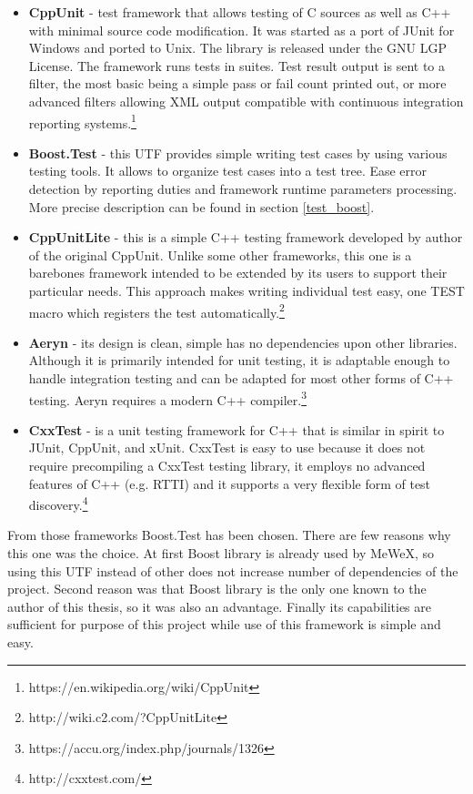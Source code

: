 \begin{itemize}
    \item \textbf{CppUnit} - test framework that allows testing of C sources as well as C++ with minimal source code modification.
            It was started as a port of JUnit for Windows and ported to Unix. The library is released under the GNU LGP License.
            The framework runs tests in suites. Test result output is sent to a filter, the most basic being a simple pass or fail count printed out, 
            or more advanced filters allowing XML output compatible with continuous integration reporting systems.\footnote{https://en.wikipedia.org/wiki/CppUnit}
    \item \textbf{Boost.Test} - this UTF provides simple writing test cases by using various testing tools. 
            It allows to organize test cases into a test tree. Ease error detection by reporting duties and framework runtime parameters processing.
            More precise description can be found in section \ref{test_boost}.
    \item \textbf{CppUnitLite} - this is a simple C++ testing framework developed by author of the original CppUnit. 
            Unlike some other frameworks, this one is a barebones framework intended to be extended by its users to support their particular needs.
            This approach makes writing individual test easy, one TEST macro which registers the test automatically.\footnote{http://wiki.c2.com/?CppUnitLite}
    \item \textbf{Aeryn} - its design is clean, simple has no dependencies upon other libraries. Although it is primarily intended for unit testing, 
            it is adaptable enough to handle integration testing and can be adapted for most other forms of C++ testing.
            Aeryn requires a modern C++ compiler.\footnote{https://accu.org/index.php/journals/1326}
    \item \textbf{CxxTest} - is a unit testing framework for C++ that is similar in spirit to JUnit, CppUnit, and xUnit. 
            CxxTest is easy to use because it does not require precompiling a CxxTest testing library, 
            it employs no advanced features of C++ (e.g. RTTI) and it supports a very flexible form of test discovery.\footnote{http://cxxtest.com/}
\end{itemize}
From those frameworks Boost.Test has been chosen. There are few reasons why this one was the choice. 
At first Boost library is already used by MeWeX, so using this UTF instead of other does not increase number of dependencies of the project. 
Second reason was that Boost library is the only one known to the author of this thesis, so it was also an advantage. 
Finally its capabilities are sufficient for purpose of this project while use of this framework is simple and easy.

